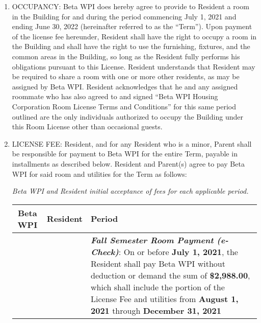 \documentclass[legalpaper, 12pt]{article}
\begin{document}
\begin{enumerate} 

        \item\label{itm:occupancy} OCCUPANCY\@:  Beta WPI does hereby agree to
                provide to Resident a room in the Building for and during the
                period commencing July 1, 2021 and ending June 30, 2022
                (hereinafter referred to as the “Term”). Upon payment of the
                license fee hereunder, Resident shall have the right to occupy
                a room in the Building and shall have the right to use the
                furnishing, fixtures, and the common areas in the Building, so
                long as the Resident fully performs his obligations pursuant to
                this License.  Resident understands that Resident may be
                required to share a room with one or more other residents, as
                may be assigned by Beta WPI\@. Resident acknowledges that he and
                any assigned roommate who has also agreed to and signed “Beta
                WPI Housing Corporation Room License Terms and Conditions” for
                this same period outlined are the only individuals authorized
                to occupy the Building under this Room License other than
                occasional guests.

        \item\label{itm:licensefee} LICENSE FEE\@: Resident, and for any
                Resident who is a minor, Parent shall be responsible for
                payment to Beta WPI for the entire Term, payable in
                installments as described below.  Resident and Parent(s) agree
                to pay Beta WPI for said room and utilities for the Term as
                follows:

                \textit{Beta WPI and Resident initial acceptance of fees for
                each applicable period.}

\begin{tabular}{|c|c|p{4in}|}
\hline
Beta WPI & Resident & Period \\ \hline

        &  & \textbf{\textit{Fall Semester Room Payment (e-Check)}}: On or
        before \textbf{July 1, 2021}, the Resident shall pay Beta WPI without
        deduction or demand the sum of \textbf{\$2,988.00}, which shall include
        the portion of the License Fee and utilities from \textbf{August 1,
        2021} through \textbf{December 31, 2021} \\ \hline


\end{tabular}
\end{enumerate}
\end{document}
